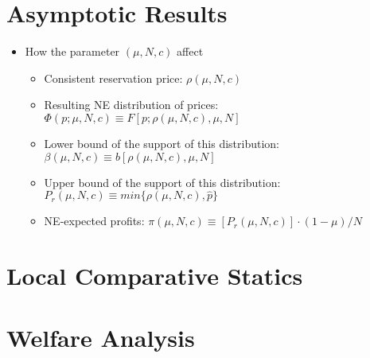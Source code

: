 \documentclass{beamer}
\begin{document}
\section{Asymptotic Results}
\begin{frame}
\begin{itemize}
	\item How the parameter $(\mu, N, c)$ affect
	\begin{itemize} 
	\item Consistent reservation price: $\rho(\mu,N,c)$
	\item Resulting NE distribution of prices: $\Phi(p;\mu,N,c)\equiv F[p;\rho(\mu,N,c),\mu,N]$
	\item Lower bound of the support of this distribution: $\beta(\mu,N,c)\equiv b[\rho(\mu,N,c),\mu,N]$
	\item Upper bound of the support of this distribution: $P_r(\mu,N,c)\equiv min\{\rho(\mu,N,c),\hat{p}\}$
	\item NE-expected profits: $\pi(\mu,N,c)\equiv[P_r(\mu,N,c)]\cdot(1-\mu)/N$
	\end{itemize}
\end{itemize}
\end{frame}


\section{Local Comparative Statics}

\section{Welfare Analysis}
\end{document}
